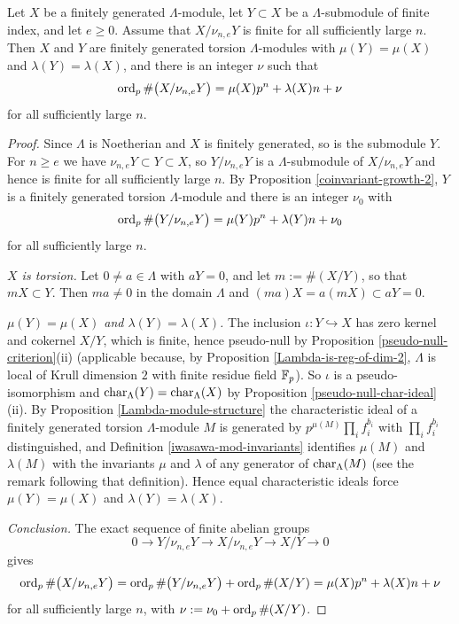 \begin{lem}
\label{finite-index-submodule-growth}
\leanok
Let $X$ be a finitely generated $\Lambda$-module, let $Y\subset X$ be a
$\Lambda$-submodule of finite index, and let $e\geq 0$.
Assume that $X/\nu_{n,e}Y$ is finite for all sufficiently large $n$.
Then $X$ and $Y$ are finitely generated torsion $\Lambda$-modules with
$\mu(Y)=\mu(X)$ and $\lambda(Y)=\lambda(X)$, and there is an integer $\nu$ such
that
$$\operatorname{ord}_p\#\big(X/\nu_{n,e}Y\big)=\mu(X)p^n+\lambda(X)n+\nu$$
for all sufficiently large $n$.
\end{lem}

\begin{proof}
\leanok
Since $\Lambda$ is Noetherian and $X$ is finitely generated, so is the submodule
$Y$.
For $n\geq e$ we have $\nu_{n,e}Y\subset Y\subset X$, so $Y/\nu_{n,e}Y$ is a
$\Lambda$-submodule of $X/\nu_{n,e}Y$ and hence is finite for all sufficiently
large $n$.
By Proposition \ref{coinvariant-growth-2}, $Y$ is a finitely generated torsion
$\Lambda$-module and there is an integer $\nu_0$ with
$$\operatorname{ord}_p\#\big(Y/\nu_{n,e}Y\big)=\mu(Y)p^n+\lambda(Y)n+\nu_0$$
for all sufficiently large $n$.

\emph{$X$ is torsion.}
Let $0\neq a\in\Lambda$ with $aY=0$, and let $m:=\#(X/Y)$, so that $mX\subset Y$.
Then $ma\neq 0$ in the domain $\Lambda$ and $(ma)X=a(mX)\subset aY=0$.

\emph{$\mu(Y)=\mu(X)$ and $\lambda(Y)=\lambda(X)$.}
The inclusion $\iota:Y\hookrightarrow X$ has zero kernel and cokernel $X/Y$,
which is finite, hence pseudo-null by Proposition
\ref{pseudo-null-criterion}(ii) (applicable because, by Proposition
\ref{Lambda-is-reg-of-dim-2}, $\Lambda$ is local of Krull dimension $2$ with
finite residue field ${\mathbb {F}}_p$).
So $\iota$ is a pseudo-isomorphism and
$\operatorname{char}_\Lambda(Y)=\operatorname{char}_\Lambda(X)$ by
Proposition \ref{pseudo-null-char-ideal}(ii).
By Proposition \ref{Lambda-module-structure} the characteristic ideal of a
finitely generated torsion $\Lambda$-module $M$ is generated by
$p^{\mu(M)}\prod_if_i^{b_i}$ with $\prod_if_i^{b_i}$ distinguished, and
Definition \ref{iwasawa-mod-invariants} identifies $\mu(M)$ and $\lambda(M)$ with
the invariants $\mu$ and $\lambda$ of any generator of $\operatorname{char}_\Lambda(M)$
(see the remark following that definition).
Hence equal characteristic ideals force $\mu(Y)=\mu(X)$ and
$\lambda(Y)=\lambda(X)$.

\emph{Conclusion.}
The exact sequence of finite abelian groups
$$0\to Y/\nu_{n,e}Y\to X/\nu_{n,e}Y\to X/Y\to 0$$
gives
$$\operatorname{ord}_p\#\big(X/\nu_{n,e}Y\big)=\operatorname{ord}_p\#\big(Y/\nu_{n,e}Y\big)+\operatorname{ord}_p\#(X/Y)
=\mu(X)p^n+\lambda(X)n+\nu$$
for all sufficiently large $n$, with $\nu:=\nu_0+\operatorname{ord}_p\#(X/Y)$.
\end{proof}


